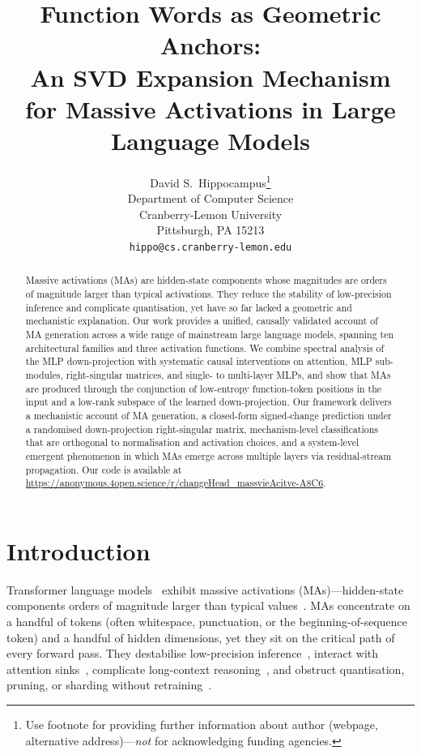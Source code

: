 \documentclass{article}
\title{Function Words as Geometric Anchors:\\
An SVD Expansion Mechanism\\
for Massive Activations in Large Language Models}
\author{%
  David S.~Hippocampus\thanks{Use footnote for providing further information
    about author (webpage, alternative address)---\emph{not} for acknowledging
    funding agencies.} \\
  Department of Computer Science\\
  Cranberry-Lemon University\\
  Pittsburgh, PA 15213 \\
  \texttt{hippo@cs.cranberry-lemon.edu} \\
}
\begin{document}
\maketitle

\begin{abstract}
Massive activations (MAs) are hidden-state components whose magnitudes are
orders of magnitude larger than typical activations. They reduce the
stability of low-precision inference and complicate quantisation, yet
have so far lacked a geometric and mechanistic explanation. Our work
provides a unified, causally validated account of MA generation across
a wide range of mainstream large language models, spanning ten
architectural families and three activation functions. We combine
spectral analysis of the MLP down-projection with systematic causal
interventions on attention, MLP sub-modules, right-singular matrices, and
single- to multi-layer MLPs, and show that MAs are produced through
the conjunction of low-entropy function-token positions in the input
and a low-rank subspace of the learned down-projection. Our framework
delivers a mechanistic account of MA generation, a closed-form
signed-change prediction under a randomised down-projection
right-singular matrix, mechanism-level classifications that are
orthogonal to normalisation and activation choices, and a system-level
emergent phenomenon in which MAs emerge across multiple layers via
residual-stream propagation. Our code is available at
\url{https://anonymous.4open.science/r/changeHead_massvieAcitve-A8C6}.
\end{abstract}

\section{Introduction}
\label{sec:intro}

Transformer language models~\citep{vaswani2017attention,brown2020language,touvron2023llama}
exhibit massive activations (MAs)---hidden-state components orders of
magnitude larger than typical values~\citep{sun2024massive,merrill2022saturated}.
MAs concentrate on a handful of tokens (often whitespace, punctuation, or the
beginning-of-sequence token) and a handful of hidden dimensions, yet they sit
on the critical path of every forward pass. They destabilise low-precision
inference~\citep{dettmers2022gpt3,bondarenko2023quantizable}, interact
with attention sinks~\citep{xiao2024efficient}, complicate long-context
reasoning~\citep{liu2024lost}, and obstruct quantisation, pruning, or
sharding without retraining~\citep{liu2024alberta}.
\end{document}
